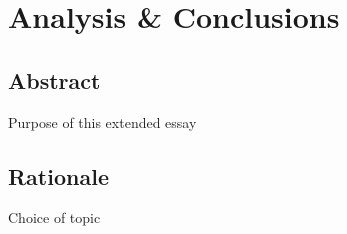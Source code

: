 
\chapter{Analysis \& Conclusions} %

\label{AnalysisConclusions} %


\section{Abstract}

Purpose of this extended essay

\section{Rationale}

Choice of topic